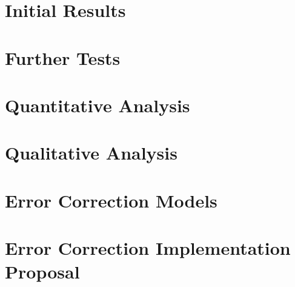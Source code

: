 \documentclass[11pt]{article}
\begin{document}
\section{Initial Results}
\section{Further Tests}
\section{Quantitative Analysis}
\section{Qualitative Analysis}
\section{Error Correction Models}
\section{Error Correction Implementation Proposal}
\end{document}
